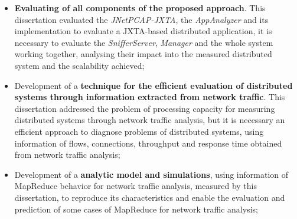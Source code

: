 \begin{itemize}
	\item \textbf{Evaluating of all components of the proposed approach}. This dissertation evaluated the \textit{JNetPCAP-JXTA}, the \textit{AppAnalyzer} and its implementation to evaluate a JXTA-based distributed application, it is necessary to evaluate the \textit{SnifferServer}, \textit{Manager} and the whole system working together, analysing their impact into the measured distributed system and the scalability achieved;	
	\item Development of a \textbf{technique for the efficient evaluation of distributed systems through information extracted from network traffic}. This dissertation addressed the problem of processing capacity for measuring distributed systems through network traffic analysis, but it is necessary an efficient approach to diagnose problems of distributed systems, using information of flows, connections, throughput and response time obtained from network traffic analysis;
	\item Development of a \textbf{analytic model and simulations}, using information of MapReduce behavior for network traffic analysis, measured by this dissertation, to reproduce its characteristics and enable the evaluation and prediction of some cases of MapReduce for network traffic analysis;
\end{itemize}
